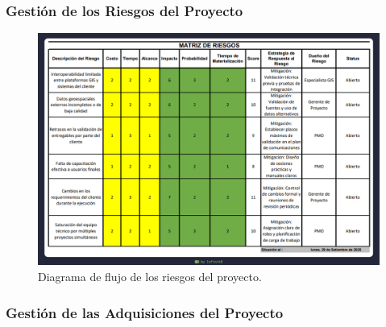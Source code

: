   \newpage

  \subsubsection{Gestión de los Riesgos del Proyecto}
  \begin{figure}[H]
        \centering
        \includegraphics[width=1.3\textwidth,angle=90,trim=1cm 1cm 1cm 1cm,clip]{assets/riesgos.png}
        \caption{Diagrama de flujo de los riesgos del proyecto.}
        \label{fig:riesgos}
      \end{figure}

  \subsubsection{Gestión de las Adquisiciones del Proyecto}

